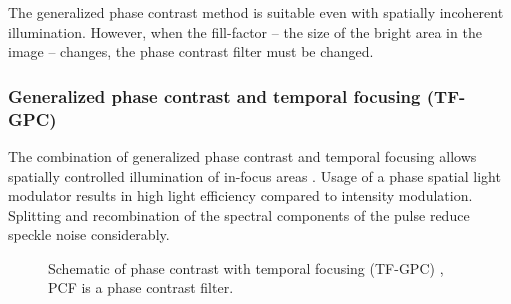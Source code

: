 The generalized phase contrast method is suitable even with spatially
incoherent illumination. However, when the
fill-factor -- the size of the bright area in the image -- changes,
the phase contrast filter must be changed.
\subsubsection{Generalized phase contrast and temporal focusing (TF-GPC)}
The combination of generalized phase contrast and temporal focusing
allows spatially controlled illumination of in-focus areas
\citep{Papagiakoumou2010}. Usage of a phase spatial light modulator
results in high light efficiency compared to intensity modulation.
Splitting and recombination of the spectral components of the pulse
reduce speckle noise considerably.
\begin{figure}[htbp]
  \centering
  \caption{Schematic of phase contrast with temporal focusing (TF-GPC)
    \citep[inspired by][]{Papagiakoumou2010}, PCF is a phase contrast filter.}
  \label{fig:tf-gpc}
\end{figure}


